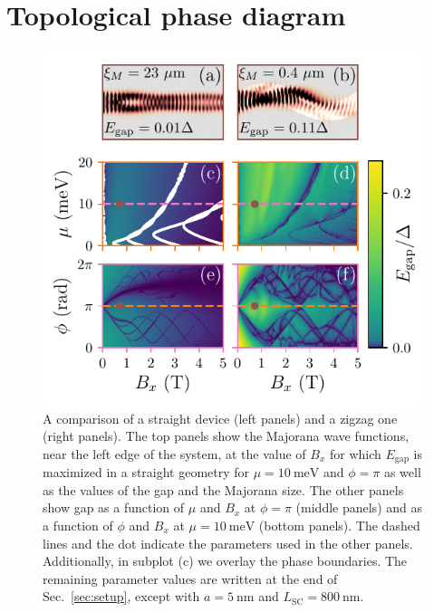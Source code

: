 \documentclass[english, twocolumn, 10pt, aps, superscriptaddress, floatfix, prb, citeautoscript]{revtex4-1}
\begin{document}
\section{Topological phase diagram}

\begin{figure}[!htb]
\includegraphics[width=\columnwidth]{figures/phasediagrams}
\caption{A comparison of a straight device (left panels) and a zigzag one (right panels).
The top panels show the Majorana wave functions, near the left edge of the system, at the value of $B_x$ for which $E_\textrm{gap}$ is maximized in a straight geometry for $\mu=\SI{10}{\meV}$ and $\phi=\pi$ as well as the values of the gap and the Majorana size.
The other panels show gap as a function of $\mu$ and $B_x$ at $\phi=\pi$ (middle panels) and as a function of $\phi$ and $B_x$ at $\mu=\SI{10}{\meV}$ (bottom panels).
The dashed lines and the dot indicate the parameters used in the other panels.
Additionally, in subplot (c) we overlay the phase boundaries.
The remaining parameter values are written at the end of Sec.~\ref{sec:setup}, except with $a=\SI{5}{\nm}$ and $L_\textrm{SC}=\SI{800}{\nm}$.
\label{fig:phasediagrams}}
\end{figure}
\end{document}
